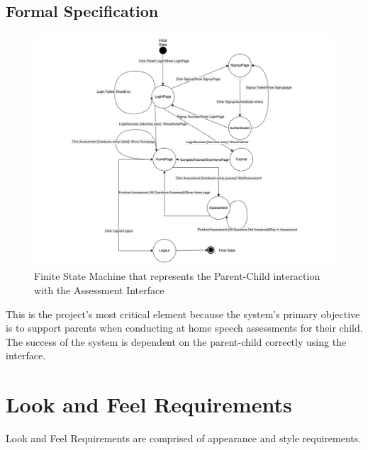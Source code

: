 \documentclass[12pt]{article}
\begin{document}
\newpage

\subsection*{Formal Specification}
\begin{figure}[H]
  \centering
  \includegraphics[scale=0.5]{images/StateMachine.pdf}
  \caption{Finite State Machine that represents the Parent-Child interaction with the Assessment Interface}
\end{figure}

\hspace{2em}This is the project's most critical element because the system's primary objective is to support parents when conducting at home speech assessments for their child. 
The success of the system is dependent on the parent-child correctly using the interface.

\newpage

\section{Look and Feel Requirements}
\hspace{2em}Look and Feel Requirements are comprised of appearance and style requirements.
\end{document}
